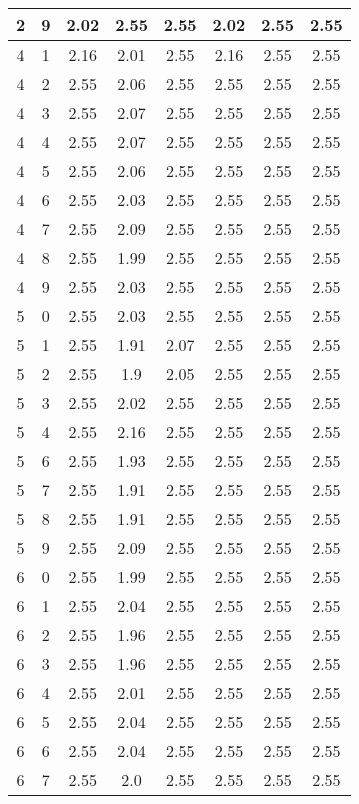 \begin{longtable}{|c|c||c||c|c||c|c|c|}
	2 & 9 & 2.02 & 2.55 & 2.55 & 2.02 & 2.55 & 2.55 \\ \hline
	4 & 1 & 2.16 & 2.01 & 2.55 & 2.16 & 2.55 & 2.55 \\ \hline
	4 & 2 & 2.55 & 2.06 & 2.55 & 2.55 & 2.55 & 2.55 \\ \hline
	4 & 3 & 2.55 & 2.07 & 2.55 & 2.55 & 2.55 & 2.55 \\ \hline
	4 & 4 & 2.55 & 2.07 & 2.55 & 2.55 & 2.55 & 2.55 \\ \hline
	4 & 5 & 2.55 & 2.06 & 2.55 & 2.55 & 2.55 & 2.55 \\ \hline
	4 & 6 & 2.55 & 2.03 & 2.55 & 2.55 & 2.55 & 2.55 \\ \hline
	4 & 7 & 2.55 & 2.09 & 2.55 & 2.55 & 2.55 & 2.55 \\ \hline
	4 & 8 & 2.55 & 1.99 & 2.55 & 2.55 & 2.55 & 2.55 \\ \hline
	4 & 9 & 2.55 & 2.03 & 2.55 & 2.55 & 2.55 & 2.55 \\ \hline
	5 & 0 & 2.55 & 2.03 & 2.55 & 2.55 & 2.55 & 2.55 \\ \hline
	5 & 1 & 2.55 & 1.91 & 2.07 & 2.55 & 2.55 & 2.55 \\ \hline
	5 & 2 & 2.55 & 1.9 & 2.05 & 2.55 & 2.55 & 2.55 \\ \hline
	5 & 3 & 2.55 & 2.02 & 2.55 & 2.55 & 2.55 & 2.55 \\ \hline
	5 & 4 & 2.55 & 2.16 & 2.55 & 2.55 & 2.55 & 2.55 \\ \hline
	5 & 6 & 2.55 & 1.93 & 2.55 & 2.55 & 2.55 & 2.55 \\ \hline
	5 & 7 & 2.55 & 1.91 & 2.55 & 2.55 & 2.55 & 2.55 \\ \hline
	5 & 8 & 2.55 & 1.91 & 2.55 & 2.55 & 2.55 & 2.55 \\ \hline
	5 & 9 & 2.55 & 2.09 & 2.55 & 2.55 & 2.55 & 2.55 \\ \hline
	6 & 0 & 2.55 & 1.99 & 2.55 & 2.55 & 2.55 & 2.55 \\ \hline
	6 & 1 & 2.55 & 2.04 & 2.55 & 2.55 & 2.55 & 2.55 \\ \hline
	6 & 2 & 2.55 & 1.96 & 2.55 & 2.55 & 2.55 & 2.55 \\ \hline
	6 & 3 & 2.55 & 1.96 & 2.55 & 2.55 & 2.55 & 2.55 \\ \hline
	6 & 4 & 2.55 & 2.01 & 2.55 & 2.55 & 2.55 & 2.55 \\ \hline
	6 & 5 & 2.55 & 2.04 & 2.55 & 2.55 & 2.55 & 2.55 \\ \hline
	6 & 6 & 2.55 & 2.04 & 2.55 & 2.55 & 2.55 & 2.55 \\ \hline
	6 & 7 & 2.55 & 2.0 & 2.55 & 2.55 & 2.55 & 2.55 \\ \hline

\end{longtable}
